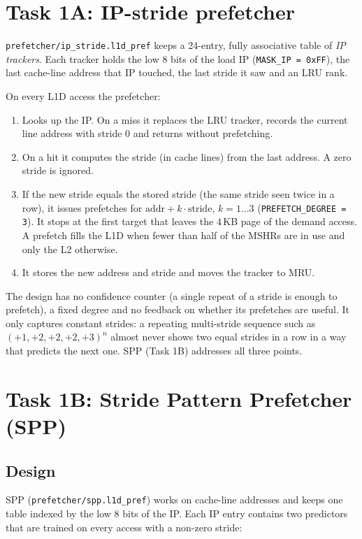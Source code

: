 \documentclass[11pt]{article}
\begin{document}
\section{Task 1A: IP-stride prefetcher}

\texttt{prefetcher/ip\_stride.l1d\_pref} keeps a 24-entry, fully associative
table of \emph{IP trackers}. Each tracker holds the low 8 bits of the load IP
(\texttt{MASK\_IP = 0xFF}), the last cache-line address that IP touched, the
last stride it saw and an LRU rank.

On every L1D access the prefetcher:
\begin{enumerate}
  \item Looks up the IP. On a miss it replaces the LRU tracker, records the
        current line address with stride 0 and returns without prefetching.
  \item On a hit it computes the stride (in cache lines) from the last address.
        A zero stride is ignored.
  \item If the new stride equals the stored stride (the same stride seen twice
        in a row), it issues prefetches for
        $\text{addr} + k \cdot \text{stride}$, $k = 1 \ldots 3$
        (\texttt{PREFETCH\_DEGREE = 3}). It stops at the first target that
        leaves the 4\,KB page of the demand access. A prefetch fills the L1D
        when fewer than half of the MSHRs are in use and only the L2 otherwise.
  \item It stores the new address and stride and moves the tracker to MRU.
\end{enumerate}

The design has no confidence counter (a single repeat of a stride is enough to
prefetch), a fixed degree and no feedback on whether its prefetches are useful.
It only captures constant strides: a repeating multi-stride sequence such as
$(+1,+2,+2,+2,+3)^n$ almost never shows two equal strides in a row in a way that
predicts the next one. SPP (Task 1B) addresses all three points.

\section{Task 1B: Stride Pattern Prefetcher (SPP)}

\subsection{Design}
SPP (\texttt{prefetcher/spp.l1d\_pref}) works on cache-line addresses and keeps
one table indexed by the low 8 bits of the IP. Each IP entry contains two
predictors that are trained on every access with a non-zero stride:
\end{document}
